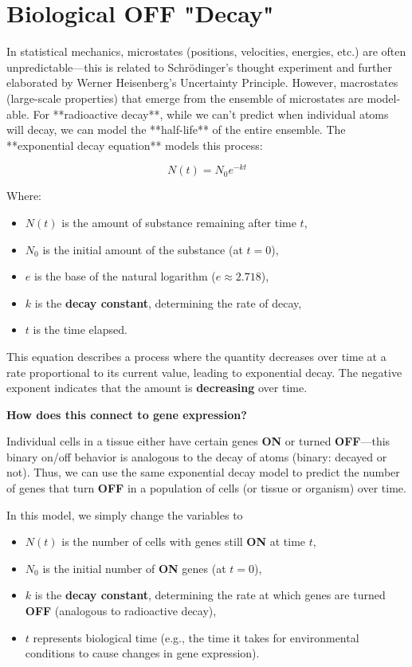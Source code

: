 \documentclass[11pt]{report}
\begin{document}
{\section{Biological OFF "Decay"}
\begin{multicols}{2}
In statistical mechanics, microstates (positions, velocities, energies, etc.) are often unpredictable—this is related to Schrödinger's thought experiment and further elaborated by Werner Heisenberg’s Uncertainty Principle. However, macrostates (large-scale properties) that emerge from the ensemble of microstates are model-able.
	For **radioactive decay**, while we can’t predict when individual atoms will decay, we can model the **half-life** of the entire ensemble. The **exponential decay equation** models this process:
	
	\[
	N(t) = N_0 e^{-kt}
	\]
	
	Where:
	\begin{itemize}
		\item \( N(t) \) is the amount of substance remaining after time \( t \),
		\item \( N_0 \) is the initial amount of the substance (at \( t = 0 \)),
		\item \( e \) is the base of the natural logarithm (\( e \approx 2.718 \)),
		\item \( k \) is the \textbf{decay constant}, determining the rate of decay,
		\item \( t \) is the time elapsed.
	\end{itemize}
	
	This equation describes a process where the quantity decreases over time at a rate proportional to its current value, leading to exponential decay. The negative exponent indicates that the amount is \textbf{decreasing} over time.
	
	\textbf{How does this connect to gene expression?} 
	
	Individual cells in a tissue either have certain genes \textbf{ON} or turned \textbf{OFF}—this binary on/off behavior is analogous to the decay of atoms (binary: decayed or not). Thus, we can use the same exponential decay model to predict the number of genes that turn \textbf{OFF} in a population of cells (or tissue or organism) over time.
	
	In this model, we simply change the variables to 
	\begin{itemize}
		\item \( N(t) \) is the number of cells with genes still \textbf{ON} at time \( t \),
		\item \( N_0 \) is the initial number of \textbf{ON} genes (at \( t = 0 \)),
		\item \( k \) is the \textbf{decay constant}, determining the rate at which genes are turned \textbf{OFF} (analogous to radioactive decay),
		\item \( t \) represents biological time (e.g., the time it takes for environmental conditions to cause changes in gene expression).
	\end{itemize}
	

\end{multicols}}
\end{document}
